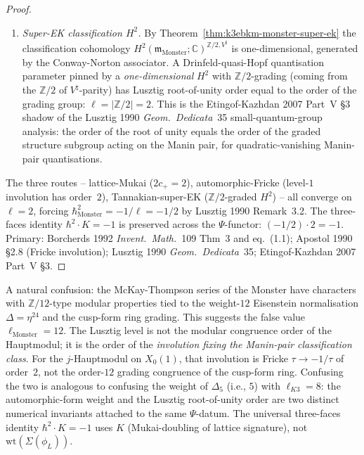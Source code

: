 \begin{proof}
\begin{enumerate}[label=\textup{(\roman*)}]
\item \emph{Super-EK classification $H^2$.} By
Theorem~\ref{thm:k3ebkm-monster-super-ek} the classification cohomology
$H^2(\mathfrak m_{\mathrm{Monster}};\mathbb{C})^{\mathbb{Z}/2, V^\natural}$
is one-dimensional, generated by the Conway-Norton associator. A
Drinfeld-quasi-Hopf quantisation parameter pinned by a
\emph{one-dimensional} $H^2$ with $\mathbb{Z}/2$-grading
(coming from the $\mathbb{Z}/2$ of $V^\natural$-parity) has Lusztig
root-of-unity order equal to the order of the grading group:
$\ell = |\mathbb{Z}/2| = 2$. This is the Etingof-Kazhdan 2007
Part~V \S3 shadow of the Lusztig 1990 \emph{Geom.\ Dedicata}~35
small-quantum-group analysis: the order of the root of unity equals
the order of the graded
structure subgroup acting on the Manin pair, for quadratic-vanishing
Manin-pair quantisations.
\end{enumerate}
The three routes -- lattice-Mukai ($2c_+ = 2$), automorphic-Fricke
(level-$1$ involution has order~$2$), Tannakian-super-EK
($\mathbb{Z}/2$-graded $H^2$) -- all converge on $\ell = 2$, forcing
$\hbar^2_{\mathrm{Monster}} = -1/\ell = -1/2$ by
Lusztig 1990 Remark~3.2. The three-faces identity
$\hbar^2\cdot K = -1$ is preserved across the $\Psi$-functor:
$(-1/2)\cdot 2 = -1$. Primary: Borcherds 1992 \emph{Invent.\ Math.}~109
Thm~3 and eq.~(1.1); Apostol 1990 \S2.8 (Fricke involution);
Lusztig 1990 \emph{Geom.\ Dedicata}~35; Etingof-Kazhdan 2007 Part~V \S3.
\end{proof}

\begin{remark}[Why \texorpdfstring{$\ell_{\mathrm{Monster}}\neq 12$}{l-Monster!= 12} despite \texorpdfstring{$j$}{j}-function \texorpdfstring{$\mathbb{Z}/12$}{Z/12} congruence]
\label{rem:k3ebkm-monster-ell-not-12}
A natural confusion: the McKay-Thompson series of the Monster have
characters with $\mathbb{Z}/12$-type modular properties tied to the
weight-$12$ Eisenstein normalisation $\Delta = \eta^{24}$ and the
cusp-form ring grading. This suggests the false value
$\ell_{\mathrm{Monster}} = 12$. The Lusztig level is not the modular congruence
order of the Hauptmodul; it is the order of the
\emph{involution fixing the Manin-pair classification class}.
For the $j$-Hauptmodul on $X_0(1)$, that involution is Fricke
$\tau\to -1/\tau$ of order~$2$, not the order-$12$ grading congruence
of the cusp-form ring. Confusing the two is analogous to confusing
the weight of $\Delta_5$ (i.e., $5$) with $\ell_{K3} = 8$: the
automorphic-form weight and the Lusztig root-of-unity order are two
distinct numerical invariants attached to the same
$\Psi$-datum. The universal three-faces identity
$\hbar^2\cdot K = -1$ uses $K$ (Mukai-doubling of lattice signature),
not $\mathrm{wt}(\Sigma(\phi_L))$.
\end{remark}

